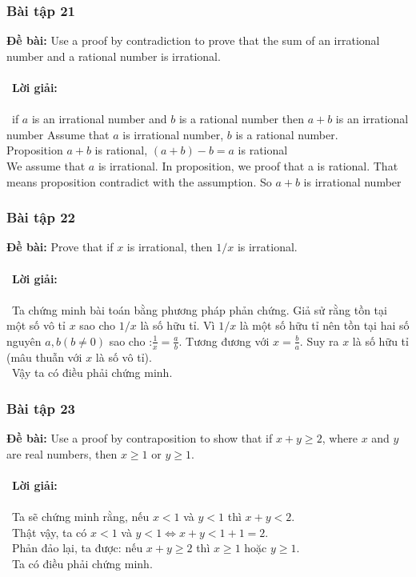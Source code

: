 \documentclass[a4paper]{article}
\begin{document}
\subsubsection{Bài tập 21}
\textbf{Đề bài:} Use a proof by contradiction to prove that the sum of an irrational number and a rational number is irrational.
\\\ \\\
\textbf{Lời giải:} \\\ \\\
if $a$ is an irrational number and $b$ is a rational number then $a+b$ is an irrational number
Assume that $a$ is irrational number, $b$ is a rational number.\\
Proposition $a+b$ is rational, $(a+b)-b=a$ is rational\\
We assume that $a$ is irrational. In proposition, we proof that a is rational. That means proposition contradict with the assumption. So $a+b$ is irrational number\\ 
\clearpage
\subsubsection{Bài tập 22}
\textbf{Đề bài: }Prove that if $x$ is irrational, then $1/x$ is irrational. \\\ \\\
\textbf{Lời giải:} \\\ \\\
Ta chứng minh bài toán bằng phương pháp phản chứng. Giả sử rằng tồn tại một số vô tỉ $x$ sao cho $1/x$ là số hữu tỉ. Vì $1/x$ là một số hữu tỉ nên tồn tại hai số nguyên $a,b (b \neq 0)$ sao cho :$\frac{1}{x} = \frac{a}{b}.$ Tương đương với $x = \frac{b}{a}$. Suy ra $x$ là số hữu tỉ (mâu thuẫn với $x$ là số vô tỉ). \\\
Vậy ta có điều phải chứng minh.
\clearpage
\subsubsection{Bài tập 23}
\textbf{Đề bài: } Use a proof by contraposition to show that if $x + y \geq 2$, where $x$ and $y$ are real numbers, then $x \geq 1$ or $y \geq 1$.\\\ \\\
\textbf{Lời giải:} \\\ \\\
Ta sẽ chứng minh rằng, nếu $x < 1$ và $y < 1$ thì $x+y< 2$. \\\
Thật vậy, ta có $x < 1$ và $y < 1 \Leftrightarrow x+y < 1+1 = 2$. \\\
Phản đảo lại, ta được: nếu $x+y \geq 2$ thì $x \geq 1$ hoặc $y \geq 1$. \\\
Ta có điều phải chứng minh.
\end{document}
